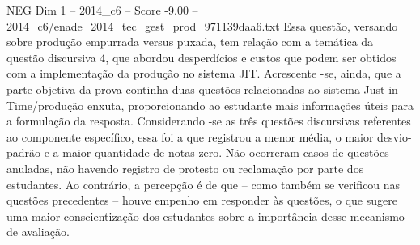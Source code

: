 \begin{textsample}{NEG Dim 1 – 2014\_c6 – Score -9.00 – 2014\_c6/enade\_2014\_tec\_gest\_prod\_971139daa6.txt}
Essa questão, versando sobre produção empurrada versus puxada, tem relação com a temática da questão discursiva 4, que abordou desperdícios e custos que podem ser obtidos com a implementação da produção no sistema JIT.
Acrescente -se, ainda, que a parte objetiva da prova continha duas questões relacionadas ao sistema Just in Time/produção enxuta, proporcionando ao estudante mais informações úteis para a formulação da resposta.
Considerando -se as três questões discursivas referentes ao componente específico, essa foi a que registrou a menor média, o maior desvio-padrão e a maior quantidade de notas zero.
Não ocorreram casos de questões anuladas, não havendo registro de protesto ou reclamação por parte dos estudantes.
Ao contrário, a percepção é de que – como também se verificou nas questões precedentes – houve empenho em responder às questões, o que sugere uma maior conscientização dos estudantes sobre a importância desse mecanismo de avaliação.

\end{textsample}
